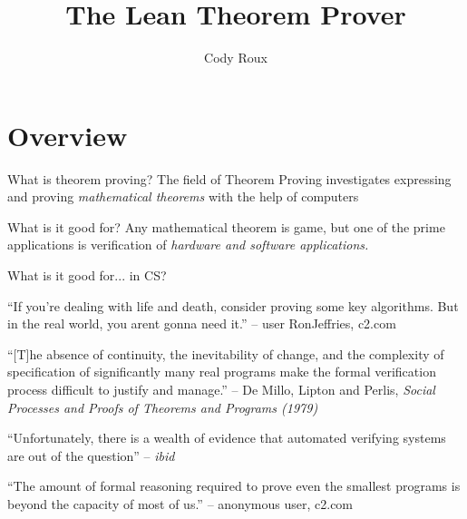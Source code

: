 \documentclass{beamer}
\title{The Lean Theorem Prover}
\author{Cody Roux}
\begin{document}
\begin{frame}
  \maketitle
\end{frame}

\section{Overview}

\begin{frame}{What is theorem proving?}
  The field of Theorem Proving investigates expressing and proving
  \emph{mathematical theorems} with the help of computers

\end{frame}

\begin{frame}{What is it good for?}
  Any mathematical theorem is game, but one of the prime applications
  is verification of \emph{hardware and software applications.}
\end{frame}

\begin{frame}{What is it good for... in CS?}
  \begin{center}
    ``If you're dealing with life and death, consider proving some key
    algorithms. But in the real world, you arent gonna need it.'' --
    user RonJeffries, c2.com
  \end{center}
  \begin{center}
    ``[T]he absence of continuity, the inevitability of change, and
    the complexity of specification of significantly many real
    programs make the formal verification process difficult to justify
    and manage.'' -- De Millo, Lipton and Perlis, {\it Social
      Processes and Proofs of Theorems and Programs (1979)}
  \end{center}
  \begin{center}
    ``Unfortunately, there is a wealth of evidence that automated
    verifying systems are out of the question'' -- {\it ibid}
  \end{center}
  \begin{center}
    ``The amount of formal reasoning required to prove even the
    smallest programs is beyond the capacity of most of us.'' --
    anonymous user, c2.com
  \end{center}
\end{frame}
\end{document}
